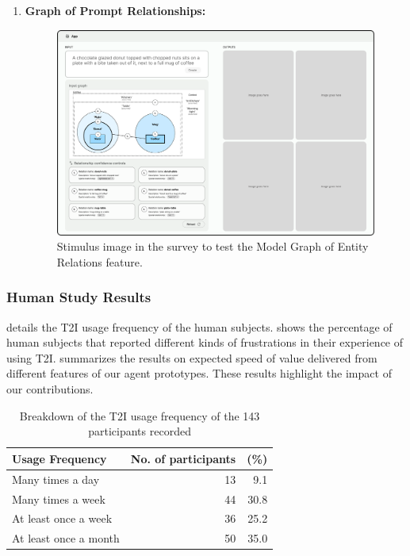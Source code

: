 \begin{enumerate}
\item \textbf{Graph of Prompt Relationships:} 
\begin{figure} [H]
    \centering
    \includegraphics[width=.9\linewidth]{figures/F3_Relations.pdf}
    \caption{Stimulus image in the survey to test the Model Graph of Entity Relations feature.}
    \label{fig:interface-human3}
\end{figure} 

\end{enumerate}

\subsubsection{Human Study Results}
 details the T2I usage frequency of the human subjects.  shows the percentage of human subjects that reported different kinds of frustrations in their experience of using T2I.  summarizes the results on expected speed of value delivered from different features of our agent prototypes. These results highlight the impact of our contributions.
\begin{table}[h]
\caption{Breakdown of the T2I usage frequency of the 143 participants recorded}
\centering
\label{tab:t2i_frequency}
\begin{tabular}{lrr} 
\toprule
\textbf{Usage Frequency} & \textbf{No. of participants} & \textbf{(\%)} \\
\midrule
Many times a day & 13 & 9.1 \\ 
Many times a week & 44 & 30.8 \\
At least once a week & 36 & 25.2 \\
At least once a month & 50 & 35.0 \\
\bottomrule
\end{tabular}
\end{table}


